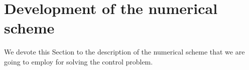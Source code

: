 \section{Development of the numerical scheme}\label{fe_sec}

We devote this Section to the description of the numerical scheme that we are going to employ for solving the control problem.
%
%

